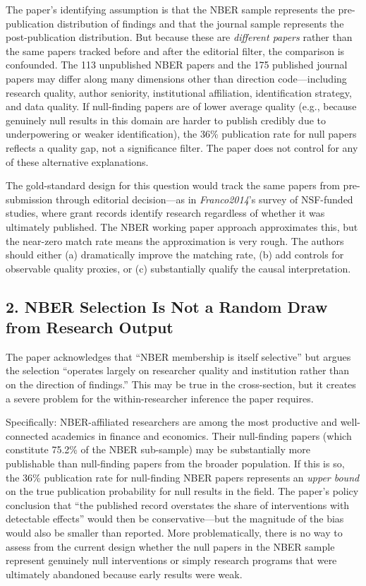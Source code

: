 \documentclass[12pt]{article}
\begin{document}
The paper's identifying assumption is that the NBER sample represents the
pre-publication distribution of findings and that the journal sample
represents the post-publication distribution.  But because these are
\emph{different papers} rather than the same papers tracked before and after
the editorial filter, the comparison is confounded.  The 113 unpublished
NBER papers and the 175 published journal papers may differ along many
dimensions other than direction code---including research quality, author
seniority, institutional affiliation, identification strategy, and data
quality.  If null-finding papers are of lower average quality (e.g., because
genuinely null results in this domain are harder to publish credibly due to
underpowering or weaker identification), the 36\% publication rate for null
papers reflects a quality gap, not a significance filter.  The paper does
not control for any of these alternative explanations.

The gold-standard design for this question would track the same papers from
pre-submission through editorial decision---as in \textit{Franco2014}'s
survey of NSF-funded studies, where grant records identify research regardless
of whether it was ultimately published.  The NBER working paper approach
approximates this, but the near-zero match rate means the approximation is
very rough.  The authors should either (a) dramatically improve the matching
rate, (b) add controls for observable quality proxies, or (c) substantially
qualify the causal interpretation.

\subsection*{2. NBER Selection Is Not a Random Draw from Research Output}

The paper acknowledges that ``NBER membership is itself selective'' but argues
the selection ``operates largely on researcher quality and institution rather
than on the direction of findings.''  This may be true in the cross-section,
but it creates a severe problem for the within-researcher inference the paper
requires.

Specifically: NBER-affiliated researchers are among the most productive and
well-connected academics in finance and economics.  Their null-finding papers
(which constitute 75.2\% of the NBER sub-sample) may be substantially more
publishable than null-finding papers from the broader population.  If this
is so, the 36\% publication rate for null-finding NBER papers represents an
\emph{upper bound} on the true publication probability for null results in the
field.  The paper's policy conclusion that ``the published record overstates
the share of interventions with detectable effects'' would then be
conservative---but the magnitude of the bias would also be smaller than
reported.  More problematically, there is no way to assess from the current
design whether the null papers in the NBER sample represent genuinely null
interventions or simply research programs that were ultimately abandoned
because early results were weak.
\end{document}
